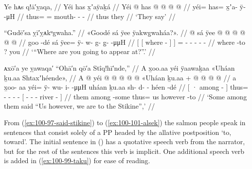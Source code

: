 \ex\label{ex:100-95-they-say}%
%
\begingl
	\glpreamble	Ye hᴀs q!ā′ỵaqa, //
	\glpreamble	Yéi has x̱ʼaÿaḵá //
	\gla	Yéi @ has @  @ {} @ {} @ {} //
	\glb	yéi= has= x̱ʼa- ÿ-  -μH //
	\glc	thus= = mouth- -  - //
	\gld	thus they  {} {} {} //
	\glft	‘They say’
		//
\endgl
\xe

\ex\label{ex:100-96-they-say}%
%
\begingl
	\glpreamble	“Gudē′sa ỵī′ỵᴀkᵘgwaha.” //
	\glpreamble	«\!Goodé sá ÿee ÿakwg̱waháa?\!». //
	\gla	{} {}  @ {} {} sá {}
		ÿee @  @ {} @ {} @ {} @ {} @ {} //
	\glb	{} {} goo -dé {} sá {}
		ÿee= ÿ- w- g- g̱-  -μμH //
	\glc	{}[ {}[ where - {}]  {}]
		= - - - -  - //
	\gld	{} {} where -to {} ? {}
		you  {} {} {} {} {} //
	\glft	‘“Where are you going to appear at?”.’
		//
\endgl
\xe

\ex\label{ex:100-97-said-stikine}%
%
\begingl
	\glpreamble	ᴀxō′a ye ỵawaqa′ “Ohā′n qō′a Stîq!hī′nde,” //
	\glpreamble	A x̱oo.aa yéi ÿaawaḵaa «\!Uháan ḵu.aa Shtaxʼhéende\!», //
	\gla	{} A  @ {} {}
		yéi @  @ {} @ {} @ {} @ {}
		«\!Uháan ḵu.aa +
		{}  @ {} @ {} @ {} @ {} {} //
	\glb	{} a x̱oo- aa {} 
		yéi= ÿ- wu- i-  -μμH
		\pqp{}uháan ḵu.aa 
		{} sh- d- - héen -dé {} //
	\glc	{}[ · among - {}]
		thus= - - -  -
		\pqp{} 
		{}[ - - - river - {}] //
	\gld	{} them among -some {}
		thus=  {} {} {} {}
		\pqp{}us however
		{}  {} {} {} -to {} //
	\glft	‘Some among them said “Us however, we are to the Stikine”,’
		//
\endgl
\xe

From (\ref{ex:100-97-said-stikine}) to (\ref{ex:100-101-alsek}) the salmon people speak in sentences that consist solely of a PP headed by the allative postposition  ‘to, toward’.
The initial sentence in (\lastx) has a quotative speech verb from the narrator, but for the rest of the sentences this verb is implicit.
One additional speech verb is added in (\ref{ex:100-99-taku}) for ease of reading.

